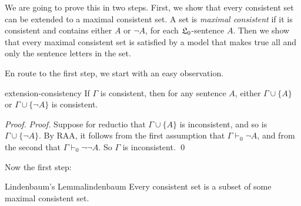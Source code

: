 We are going to prove this in two steps.
First,
we show that every consistent set can be extended to a maximal consistent set.
A set is \emph{maximal consistent} if it is consistent and
contains either $A$ or $\neg A$,
for each $\mathfrak{L}_0$-sentence $A$.
Then we show that every maximal consistent set is satisfied by
a model that makes true all and only the sentence letters in the set.

En route to the first step, we start with an easy observation.

\begin{lemma}{}{extension-consistency}
  If $\Gamma$ is consistent,
  then for any sentence $A$,
  either $\Gamma \cup \{ A \}$ or $\Gamma \cup \{ \neg A \}$ is consistent.
\end{lemma}

\begin{proof}
  \emph{Proof.}
  Suppose for reductio that
  $\Gamma \cup \{ A \}$ is inconsistent,
  and so is $\Gamma \cup \{ \neg A \}$.
  By RAA,
  it follows from the first assumption that $\Gamma \vdash_{0} \neg A$,
  and from the second that $\Gamma \vdash_{0} \neg\neg A$.
  So $\Gamma$ is inconsistent. \qed
\end{proof}

Now the first step:

\begin{lemma}{Lindenbaum's Lemma}{lindenbaum}
  Every consistent set is a subset of some maximal consistent set.
\end{lemma}

